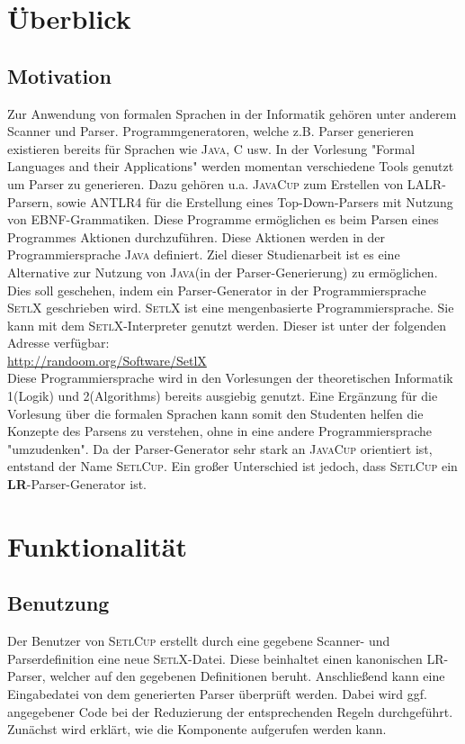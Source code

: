 \section{Überblick}
\subsection{Motivation}
Zur Anwendung von formalen Sprachen in der Informatik gehören unter anderem Scanner und Parser\cite{Aho86}. 
Programmgeneratoren, welche z.B. Parser generieren existieren bereits für Sprachen wie \textsc{Java}\cite{javacup:2016}, \textsc{C}\cite{donnelly1990} usw.
In der Vorlesung "Formal Languages and their Applications"\cite{stroetmann:formallanguages} werden momentan verschiedene Tools genutzt um Parser zu generieren. Dazu gehören u.a. \textsc{JavaCup} zum Erstellen von LALR-Parsern, sowie \textsc{ANTLR4}\cite{parr:2012} für die Erstellung eines Top-Down-Parsers mit Nutzung von EBNF-Grammatiken. Diese Programme ermöglichen es  beim Parsen eines Programmes Aktionen durchzuführen. Diese Aktionen werden in der Programmiersprache \textsc{Java} definiert.
Ziel dieser Studienarbeit ist es eine Alternative zur Nutzung von \textsc{Java}(in der Parser-Generierung) zu ermöglichen. Dies soll geschehen, indem ein Parser-Generator in der Programmiersprache \textsc{SetlX} geschrieben wird. \textsc{SetlX} ist eine mengenbasierte Programmiersprache. Sie kann mit dem \textsc{SetlX}-Interpreter genutzt werden. Dieser ist unter der folgenden Adresse verfügbar:\\
\href{http://randoom.org/Software/SetlX}{{http://randoom.org/Software/SetlX}}\\
Diese Programmiersprache wird in den Vorlesungen der theoretischen Informatik 1(Logik)\cite{stroetmann:logic} und 2(Algorithms)\cite{stroetmann:algorithms} bereits ausgiebig genutzt. Eine Ergänzung für die Vorlesung über die formalen Sprachen kann somit den Studenten helfen die Konzepte des Parsens zu verstehen, ohne in eine andere Programmiersprache "umzudenken". Da der Parser-Generator sehr stark an \textsc{JavaCup} orientiert ist, entstand der Name \textsc{SetlCup}. Ein großer Unterschied ist jedoch, dass \textsc{SetlCup} ein \textbf{LR}-Parser-Generator ist.
\section{Funktionalität}
\subsection{Benutzung}
Der Benutzer von \textsc{SetlCup} erstellt durch eine gegebene Scanner- und Parserdefinition eine neue \textsc{SetlX}-Datei. Diese beinhaltet einen kanonischen LR-Parser, welcher auf den gegebenen Definitionen beruht. Anschließend kann eine Eingabedatei von dem generierten Parser überprüft werden. Dabei wird ggf. angegebener Code bei der Reduzierung der entsprechenden Regeln durchgeführt. 
Zunächst wird erklärt, wie die Komponente aufgerufen werden kann.
